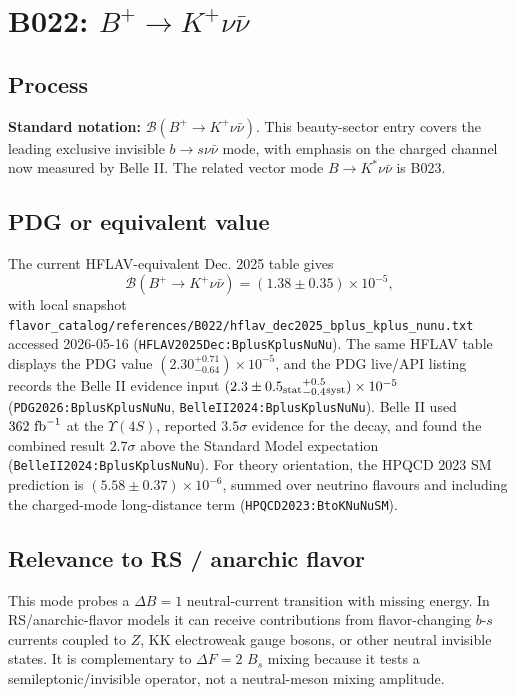 
\section{B022: \(B^+\to K^+\nu\bar{\nu}\)}

\subsection*{Process}
\textbf{Standard notation:} \(\mathcal{B}(B^+\to K^+\nu\bar{\nu})\).
This beauty-sector entry covers the leading exclusive invisible
\(b\to s\nu\bar{\nu}\) mode, with emphasis on the charged channel now measured
by Belle II.  The related vector mode \(B\to K^*\nu\bar{\nu}\) is B023.

\subsection*{PDG or equivalent value}
The current HFLAV-equivalent Dec. 2025 table gives
\[
  \mathcal{B}(B^+\to K^+\nu\bar{\nu})=(1.38\pm0.35)\times10^{-5},
\]
with local snapshot
\texttt{flavor\_catalog/references/B022/hflav\_dec2025\_bplus\_kplus\_nunu.txt}
accessed 2026-05-16 (\texttt{HFLAV2025Dec:BplusKplusNuNu}).  The same HFLAV
table displays the PDG value
\((2.30^{+0.71}_{-0.64})\times10^{-5}\), and the PDG live/API listing records
the Belle II evidence input
\((2.3\pm0.5_{\rm stat}{}^{+0.5}_{-0.4}{}_{\rm syst})\times10^{-5}\)
(\texttt{PDG2026:BplusKplusNuNu}, \texttt{BelleII2024:BplusKplusNuNu}).
Belle II used \(362~{\rm fb}^{-1}\) at the \(\Upsilon(4S)\), reported
\(3.5\sigma\) evidence for the decay, and found the combined result
\(2.7\sigma\) above the Standard Model expectation
(\texttt{BelleII2024:BplusKplusNuNu}).  For theory orientation, the HPQCD 2023
SM prediction is
\((5.58\pm0.37)\times10^{-6}\), summed over neutrino flavours and including the
charged-mode long-distance term (\texttt{HPQCD2023:BtoKNuNuSM}).

\subsection*{Relevance to RS / anarchic flavor}
This mode probes a \(\Delta B=1\) neutral-current transition with missing
energy.  In RS/anarchic-flavor models it can receive contributions from
flavor-changing \(b\)-\(s\) currents coupled to \(Z\), KK electroweak gauge
bosons, or other neutral invisible states.  It is complementary to
\(\Delta F=2\) \(B_s\) mixing because it tests a semileptonic/invisible
operator, not a neutral-meson mixing amplitude.


